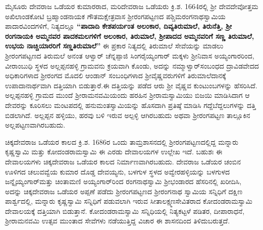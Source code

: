 ಮೈಸೂರು ದೇವರಾಜ ಒಡೆಯರ ಕುಮಾರರಾದ, ಮರಿದೇವರಾಜ ಒಡೆಯರು ಕ್ರಿ.ಶ. 1664ರಲ್ಲಿ ಶ‍್ರೀ ದೇವದೇವೋತ್ತಮ ಅಖಿಲಾಂಡಕೋಟಿ ಬ್ರಹ್ಮಾಂಡನಾಯಕ ಗೌತಮಕ್ಷೇತ್ರವಾಸ ಶ‍್ರೀರಂಗಪಟ್ಟಣದ ಪಶ್ಚಿಮರಂಗನಾಥಸ್ವಾಮಿಯ ಪಾದಾರವಿಂದ\-ಗಳಿಗೆ, ನಿತ್ಯದಲ್ಲೂ \textbf{“ಪಾದಾದಿ ಕೇಶಪರ್ಯಂತ ಅಲಂಕಾರ, ದಿವ್ಯತಿರುಮಾಲೆ, ತಿರುನೆತ್ತಿ, ಶ‍್ರೀ ರಂಗನಾಯಕಿ ಅಮ್ಮನವರ ಪಾದಕಮಲಗಳಿಗೆ ಅಲಂಕಾರ, ತಿರುಮಾಲೆ, ಶ‍್ರೀಪಾದದ ಅಮ್ಮನವರಿಗೆ ಸಣ್ಣ ತಿರುಮಾಲೆ, ಉಭಯ ನಾಚ್ಚಿಯಾರರಿಗೆ ಸಣ್ಣತಿರುಮಾಲೆ”} ಈ ಪ್ರಕಾರ ನಿತ್ಯದಲ್ಲಿ ತಿರುಮಾಲೆ ಸೇವೆಯನ್ನು ಮಾಡಲು ಶ‍್ರೀರಂಗಪಟ್ಟಣದ ತಿರುಮಲೆ ಅನಂತ ಆಳ್ವಾರ್​ ಚೆನ್ನಪ್ಪಾಜಿ ಸಿಂಗರೈಯ್ಯಂಗಾರ್​ ಮಕ್ಕಳು ಶ‍್ರೀನಿವಾಸ ಅಯ್ಯಂಗಾರರಿಂದ, ವೀರಾಂಬುಧಿ ಸ್ಥಳದ ಅಲ್ಲಪ್ಪನಹಳ್ಳಿ ಗ್ರಾಮವನು ಕ್ರಯವಾಗಿ ಕೊಂಡು, ಅದನ್ನು ನಮ್ಮಾಳ್ವಾರ್​ ಸಂಬಂಧದ ದ್ರಾವಿಡವೇದದ ಅಧಿಕಾರಿಗಳಾದ ಶ‍್ರೀರಂಗದ ಮೊದಲಿ ಆಂಡಾನ್ ಸಂಬಂಧಿಗಳಾದ ಶ‍್ರೀವೈಷ್ಣವರುಗಳಿಗೆ ತಿರುಮಾಲೆದಾನಕ್ಕೆ ಉಪಾದಾನಾರ್ಥವಾಗಿ ದತ್ತಿಯಾಗಿ ಬಿಡುತ್ತಾರೆ.ಈ ದತ್ತಿಯನ್ನು ಪಡೆದ ಆರು ಶ‍್ರೀ ವೈಷ್ಣವ ಕುಂಟುಂಬಗಳನ್ನು ಹೆಸರಿಸಿದೆ. ಅಲ್ಲಪ್ಪನಹಳ್ಳಿ ಗ್ರಾಮದ ಮುಂದೆ ಶ‍್ರೀರಾಮನವಮಿಯಂದು ಹರಹಿನ ಶ‍್ರೀರಾಮಸ್ವಾಮಿಯು ಬಿಜಯಿ ಮಾಡಿಸಿದಾಗ ಆ ದೇವರನ್ನು ಕೂರಿಸಲು ಮಂಟಪದಲ್ಲಿ ಹನುಮಂತಸ್ವಾಮಿಯನ್ನು ಹೊಸದಾಗಿ ಪ್ರತಿಷ್ಠೆ ಮಾಡಿಸಿ ಗದ್ದೆಬೆದ್ದಲುಗಳನ್ನು ದತ್ತಿ ಬಿಡಲಾಗಿದೆ. ಅಲ್ಲಪ್ಪನ ಹಳ್ಳಿಯು, ಹರವು ಬಳಿ ಇರುವ ಅಲ್ಪಳ್ಳಿ ಆಗಿರಬಹುದು ಅಥವಾ ಶ‍್ರೀರಂಗಪಟ್ಟಣ ತಾಲ್ಲೂಕಿನ ಅಲ್ಲಪಟ್ಟಣವಾಗಿರಬಹುದು.

ಚಿಕ್ಕದೇವರಾಜ ಒಡೆಯರ ಕಾಲದ ಕ್ರಿ.ಶ. 1686ರ ಒಂದು ತಾಮ್ರಶಾಸನದಲ್ಲಿ ಶ‍್ರೀರಂಗಪಟ್ಟಣದಲ್ಲಿದ್ದ ಮನ್ನಾರು ಕೃಷ್ಣಸ್ವಾಮಿ ಮತ್ತು ಕೋದಂಡರಾಮಸ್ವಾಮಿ ಈ ಎರಡು ದೇವಾಲಯಗಳ ಉಲ್ಲೇಖ ಇದೆ. ಬಹುಶಃ ಈ ದೇವಾಲಯಗಳು ಚಿಕ್ಕದೇವರಾಜ ಒಡೆಯರ ಕಾಲದ ನಿರ್ಮಾಣವಾಗಿರಬಹುದು. ದೇವರಾಜ ಒಡೆಯರ ಚಂಬಿನ ಊಳಿಗದ ಚಲುವವ್ವೆಯ ಕುಮಾರ ದೊಡ್ಡ ದೇವಯ್ಯನು, ಬಳಗುಳ ಸ್ಥಳದ ಅವ್ವೇರಹಳ್ಳಿಯನ್ನು ಬಳಗುಳದ ಜನ್ನೈಯ್ಯಂಗಾರ್​ ಮತ್ತು ಚಿಂತಾಮಣಿ ಅಯ್ಯಂಗಾರ್​ರಿಂದ ರಂಗನಾಥಸ್ವಾಮಿ ಶ‍್ರೀಭಂಡಾರದ ಹೆಸರಿನಲ್ಲಿ ಖರೀದಿಸಿ, ಅದನ್ನು ಚಿಕ್ಕದೇವರಾಜ ಒಡೆಯರ ಅಪ್ಪಣೆ ಪಡೆದು ಶ‍್ರೀರಂಗಪಟ್ಟಣದ ಶ‍್ರೀರಂಗನಾಥ ಸ್ವಾಮಿಯ ಸನ್ನಿಧಿಗೆ ದಕ್ಷಿಣ ಪಾರ್ಶ್ವದಲ್ಲಿ, ಮನ್ನಾರು ಕೃಷ್ಣಸ್ವಾಮಿ ಸನ್ನಿಧಿಗೆ ಪಡುವಲಾಗಿ ಇರುವ ಸೀತಾಲಕ್ಷ್ಮಣಸೇವಿತರಾದ ಕೋದಂಡರಾಮಸ್ವಾಮಿ ದೇವಾಲಯಕ್ಕೆ ದತ್ತಿಯಾಗಿ ಬಿಡುತ್ತಾನೆ. ಕೋದಂಡರಾಮಸ್ವಾಮಿ ಸನ್ನಿಧಿಯಲ್ಲಿ ನಿತ್ಯಕಟ್ಟಳೆ ಪಡಿತರ, ದೀಪಾರಾಧನೆ, ಶ‍್ರೀರಾಮನವಮಿ ಉತ್ಸವ ಮುಂತಾದ ಸೇವೆಗಳು ನಡೆಯುತ್ತಿದ್ದ ವಿಚಾರ ಈ ಶಾಸನದಿಂದ ತಿಳಿದುಬರುತ್ತದೆ.

